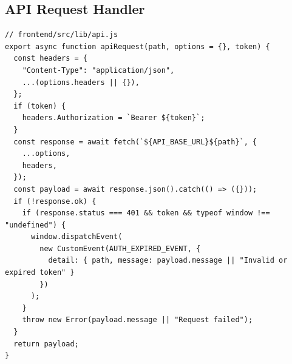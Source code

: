 \documentclass[12pt,a4paper]{article}
\begin{document}
\subsection{API Request Handler}
\begin{lstlisting}
// frontend/src/lib/api.js
export async function apiRequest(path, options = {}, token) {
  const headers = {
    "Content-Type": "application/json",
    ...(options.headers || {}),
  };
  if (token) {
    headers.Authorization = `Bearer ${token}`;
  }
  const response = await fetch(`${API_BASE_URL}${path}`, {
    ...options,
    headers,
  });
  const payload = await response.json().catch(() => ({}));
  if (!response.ok) {
    if (response.status === 401 && token && typeof window !== "undefined") {
      window.dispatchEvent(
        new CustomEvent(AUTH_EXPIRED_EVENT, {
          detail: { path, message: payload.message || "Invalid or expired token" }
        })
      );
    }
    throw new Error(payload.message || "Request failed");
  }
  return payload;
}
\end{lstlisting}
\end{document}
